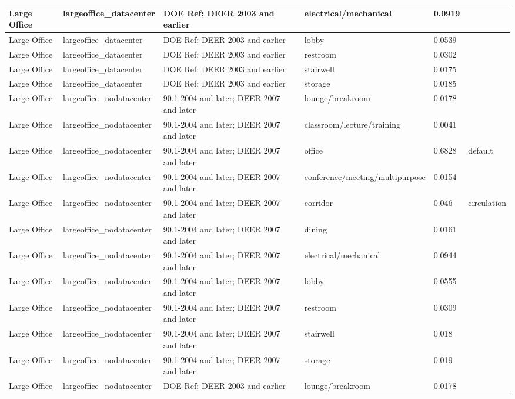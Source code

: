 \begin{center}
\begin{longtable}{|p{1.0in}|p{1.05in}|p{1.1in}|p{1.9in}|p{0.55in}|p{0.95in}|}
Large Office & largeoffice\_datacenter & DOE Ref; DEER 2003 and earlier & electrical/mechanical & 0.0919 &  \\ \hline
Large Office & largeoffice\_datacenter & DOE Ref; DEER 2003 and earlier & lobby & 0.0539 &  \\ \hline
Large Office & largeoffice\_datacenter & DOE Ref; DEER 2003 and earlier & restroom & 0.0302 &  \\ \hline
Large Office & largeoffice\_datacenter & DOE Ref; DEER 2003 and earlier & stairwell & 0.0175 &  \\ \hline
Large Office & largeoffice\_datacenter & DOE Ref; DEER 2003 and earlier & storage & 0.0185 &  \\ \hline
Large Office & largeoffice\_nodatacenter & 90.1-2004 and later; DEER 2007 and later & lounge/breakroom & 0.0178 &  \\ \hline
Large Office & largeoffice\_nodatacenter & 90.1-2004 and later; DEER 2007 and later & classroom/lecture/training & 0.0041 &  \\ \hline
Large Office & largeoffice\_nodatacenter & 90.1-2004 and later; DEER 2007 and later & office & 0.6828 & default \\ \hline
Large Office & largeoffice\_nodatacenter & 90.1-2004 and later; DEER 2007 and later & conference/meeting/multipurpose & 0.0154 &  \\ \hline
Large Office & largeoffice\_nodatacenter & 90.1-2004 and later; DEER 2007 and later & corridor & 0.046 & circulation \\ \hline
Large Office & largeoffice\_nodatacenter & 90.1-2004 and later; DEER 2007 and later & dining & 0.0161 &  \\ \hline
Large Office & largeoffice\_nodatacenter & 90.1-2004 and later; DEER 2007 and later & electrical/mechanical & 0.0944 &  \\ \hline
Large Office & largeoffice\_nodatacenter & 90.1-2004 and later; DEER 2007 and later & lobby & 0.0555 &  \\ \hline
Large Office & largeoffice\_nodatacenter & 90.1-2004 and later; DEER 2007 and later & restroom & 0.0309 &  \\ \hline
Large Office & largeoffice\_nodatacenter & 90.1-2004 and later; DEER 2007 and later & stairwell & 0.018 &  \\ \hline
Large Office & largeoffice\_nodatacenter & 90.1-2004 and later; DEER 2007 and later & storage & 0.019 &  \\ \hline
Large Office & largeoffice\_nodatacenter & DOE Ref; DEER 2003 and earlier & lounge/breakroom & 0.0178 &  \\ \hline

\end{longtable}
\end{center}
